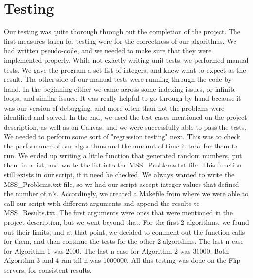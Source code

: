 \documentclass[11pt,letterpaper]{article}
\begin{document}
\section{Testing}
\hspace{25pt}Our testing was quite thorough through out the completion of the project. The first measures taken for testing were for the correctness of our algorithms. We had written pseudo-code, and we needed to make sure that they were implemented properly. While not exactly writing unit tests, we performed manual tests. We gave the program a set list of integers, and knew what to expect as the result. The other side of our manual tests were running through the code by hand. In the beginning either we came across some indexing issues, or infinite loops, and similar issues. It was really helpful to go through by hand because it was our version of debugging, and more often than not the problems were identified and solved. In the end, we used the test cases mentioned on the project description, as well as on Canvas, and we were successfully able to pass the tests.\\
\hspace{25pt}We needed to perform some sort of "regression testing" next. This was to check the performance of our algorithms and the amount of time it took for them to run. We ended up writing a little function that generated random numbers, put them in a list, and wrote the list into the MSS\_Problems.txt file. This function still exists in our script, if it need be checked. We always wanted to write the MSS\_Problems.txt file, so we had our script accept integer values that defined the number of n's. Accordingly, we created a Makefile from where we were able to call our script with different arguments and append the results to MSS\_Results.txt. The first arguments were ones that were mentioned in the project description, but we went beyond that. For the first 2 algorithms, we found out their limits, and at that point, we decided to comment out the function calls for them, and then continue the tests for the other 2 algorithms. The last n case for Algorithm 1 was 2000. The last n case for Algorithm 2 was 30000. Both Algorithm 3 and 4 ran till n was 1000000. All this testing was done on the Flip servers, for consistent results.\\
\end{document}
